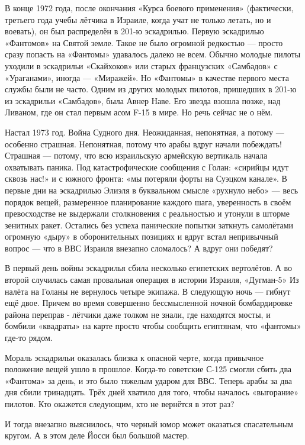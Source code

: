 В конце 1972 года, после окончания «Курса боевого применения» (фактически, третьего года учебы лётчика в Израиле, когда учат не только летать, но и воевать), он был распределён в 201-ю эскадрилью. Первую эскадрилью «Фантомов» на Святой земле. Такое не было огромной редкостью — просто сразу попасть на «Фантомы» удавалось далеко не всем. Обычно молодые пилоты уходили в эскадрильи «Скайхоков» или старых французских «Самбадов» с «Ураганами», иногда — «Миражей». Но «Фантомы» в качестве первого места службы были не часто. Одним из других молодых пилотов, пришедших в 201-ю из эскадрильи «Самбадов», была Авнер Наве. Его звезда взошла позже, над Ливаном, где он стал первым асом F-15 в мире. Но речь сейчас не о нём.

Настал 1973 год. Война Судного дня. Неожиданная, непонятная, а потому — особенно страшная. Непонятная, потому что арабы вдруг начали побеждать! Страшная — потому, что всю израильскую армейскую вертикаль начала охватывать паника. Под катастрофические сообщения с Голан: «сирийцы идут сквозь нас!» и с южного фронта: «мы потеряли форты на Суэцком канале». В первые дни на эскадрилью Элиэля в буквальном смысле «рухнуло небо» — весь порядок вещей, размеренное планирование каждого шага, уверенность в своём превосходстве не выдержали столкновения с реальностью и утонули в шторме зенитных ракет. Остались без успеха панические попытки заткнуть самолётами огромную «дыру» в оборонительных позициях и вдруг встал непривычный вопрос — что в ВВС Израиля внезапно сломалось? А вдруг они победят?

В первый день войны эскадрилья сбила несколько египетских вертолётов. А во второй случилась самая провальная операция в истории Израиля, «Дугман-5» Из налёта на Голаны не вернулось четыре экипажа. В следующую ночь — гибнут ещё двое. Причем во время совершенно бессмысленной ночной бомбардировке района переправ - лётчики даже толком не знали, где находятся мосты, и бомбили «квадраты» на карте просто чтобы сообщить египтянам, что «фантомы» где-то рядом.

Мораль эскадрильи оказалась близка к опасной черте, когда привычное положение вещей ушло в прошлое. Когда-то советские С-125 смогли сбить два «Фантома» за день, и это было тяжелым ударом для ВВС. Теперь арабы за два дня сбили тринадцать. Трёх дней хватило для того, чтобы началось «выгорание» пилотов. Кто окажется следующим, кто не вернётся в этот раз?

И тогда внезапно выяснилось, что черный юмор может оказаться спасательным кругом. А в этом деле Йосси был большой мастер.

